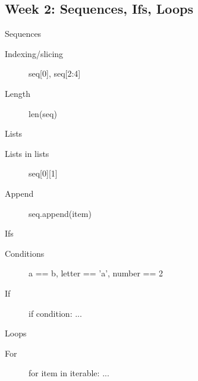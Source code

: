 \documentclass[aspectratio=169,usenames,dvipsnames]{beamer}
\begin{document}
\subsection{Week 2: Sequences, Ifs, Loops}
\begin{frame}[fragile]{Sequences}
    \begin{description}
        \item[Indexing/slicing] seq[0], seq[2:4]
        \item[Length] len(seq)
    \end{description}
\end{frame}
\begin{frame}[fragile]{Lists}
    \begin{description}
        \item[Lists in lists] seq[0][1]
        \item[Append] seq.append(item)
    \end{description}
\end{frame}
\begin{frame}[fragile]{Ifs}
    \begin{description}
        \item[Conditions] a == b, letter == 'a', number == 2
        \item[If] if condition: ...
    \end{description}
\end{frame}
\begin{frame}[fragile]{Loops}
    \begin{description}
        \item[For] for item in iterable: ...
    \end{description}
\end{frame}
\end{document}
